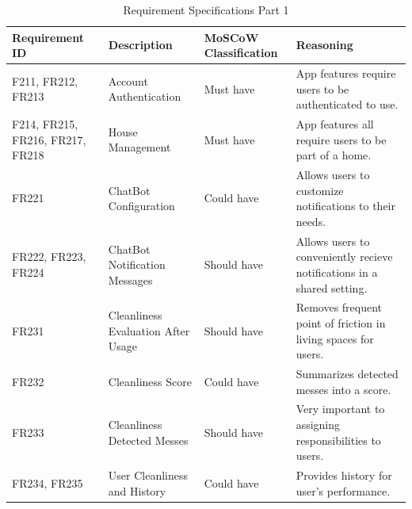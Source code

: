 \documentclass{scrreprt}
\theoremstyle{definition}
\begin{document}
\begin{table}[H]
    \flushleft
    \begin{tabularx}{\textwidth}{|>{\raggedright}X|>{\raggedright}X|>{\raggedright}X|X|}
    \hline
    \textbf{Requirement ID} & \textbf{Description} & \textbf{MoSCoW Classification} & \textbf{Reasoning} \\ \hline
    F211, FR212, FR213 & Account Authentication & Must have & App features require users to be authenticated to use. \\ \hline

    F214, FR215, FR216, FR217, FR218 & House Management & Must have & App features all require users to be part of a home. \\ \hline

    FR221 & ChatBot Configuration & Could have & Allows users to customize notifications to their needs. \\ \hline

    FR222, FR223, FR224 & ChatBot Notification Messages & Should have & Allows users to conveniently recieve notifications in a shared setting. \\ \hline

    FR231 & Cleanliness Evaluation After Usage & Should have & Removes frequent point of friction in living spaces for users. \\ \hline

    FR232 & Cleanliness Score & Could have & Summarizes detected messes into a score. \\ \hline

    FR233 & Cleanliness Detected Messes & Should have & Very important to assigning responsibilities to users. \\ \hline

    FR234, FR235 & User Cleanliness and History & Could have & Provides history for user's performance. \\ \hline
\end{tabularx}
\caption{Requirement Specifications Part 1}
\end{table}
\end{document}
